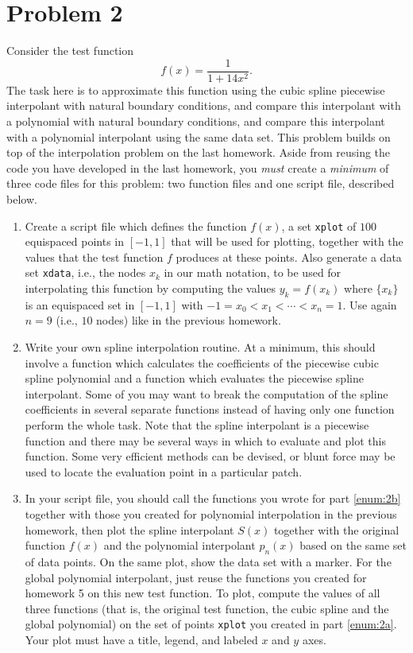 \section{Problem 2}%
\label{sec:problem_2}
Consider the test function
\begin{equation*}
  f(x) = \frac{1}{1 + 14 x^{2}}.
\end{equation*}
The task here is to approximate this function using the cubic spline piecewise interpolant with natural boundary conditions, and compare this interpolant with a polynomial with natural boundary conditions, and compare this interpolant with a polynomial interpolant using the same data set. This problem builds on top of the interpolation problem on the last homework. Aside from reusing the code you have developed in the last homework, you \emph{must} create a \emph{minimum} of three code files for this problem: two function files and one script file, described below.
\begin{enumerate}[label=(\alph*)]
  \item \label{enum:2a} Create a script file which defines the function $f(x)$, a set \verb|xplot| of $100$ equispaced points in $[-1, 1]$ that will be used for plotting, together with the values that the test function $f$ produces at these points. Also generate a data set \verb|xdata|, i.e., the nodes $x_{k}$ in our math notation, to be used for interpolating this function by computing the values $y_{k} = f(x_{k})$  where  $\{x_{k}\}$ is an equispaced set in $[-1, 1]$ with $-1 = x_{0} < x_{1} < \cdots < x_{n} = 1$. Use again $n = 9$ (i.e., $10$ nodes) like in the previous homework.
  \item \label{enum:2b} Write your own spline interpolation routine. At a minimum, this should involve a function which calculates the coefficients of the piecewise cubic spline polynomial and a function which evaluates the piecewise spline interpolant. Some of you may want to break the computation of the spline coefficients in several separate functions instead of having only one function perform the whole task. Note that the spline interpolant is a piecewise function and there may be several ways in which to evaluate and plot this function. Some very efficient methods can be devised, or blunt force may be used to locate the evaluation point in a particular patch.
  \item In your script file, you should call the functions you wrote for part \ref{enum:2b} together with those you created for polynomial interpolation in the  previous homework, then plot the spline interpolant $S(x)$ together with the original function $f(x)$ and the polynomial interpolant $p_{n}(x)$ based on the same set of data points. On the same plot, show the data set with a marker. For the global polynomial interpolant, just reuse the functions you created for homework 5 on this new test function. To plot, compute the values of all three functions (that is, the original test function, the cubic spline and the global polynomial) on the set of points \verb|xplot| you created in part \ref{enum:2a}. Your plot must have a title, legend, and labeled $x$ and $y$ axes.
\end{enumerate}

